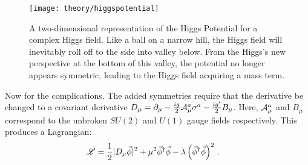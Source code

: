     \begin{figure}[h!]
        \texttt{[image: theory/higgspotential]}
        \caption{A two-dimensional representation of the Higgs Potential for a complex Higgs field\cite{higgspotential}.
            Like a ball on a narrow hill, the Higgs field will inevitably roll off to the side into valley below.
            From the Higgs's new perspective at the bottom of this valley,
                the potential no longer appears symmetric,
                leading to the Higgs field acquiring a mass term.
        }
        \label{fig:higgs_potential}
    \end{figure}

    Now for the complications.
    The added symmetries require that the derivative be changed to a covariant derivative 
        $D_{\mu} = \partial_{\mu} - \frac{ig}{2} \mathcal{A}^a_{\mu} \sigma^a - \frac{ig'}{2} B_{\mu}$.
    Here, $\mathcal{A}^a_\mu$ and $B_\mu$ correspond to the unbroken $SU(2)$ and $U(1)$ gauge fields respectively.
    This produces a Lagrangian:
    \begin{equation} \begin{split}
        \mathscr{L} &= \frac{1}{2} |D_{\mu} \vec{\phi}|^2 +
            \mu^2 \vec{\phi}^\dag \vec{\phi} - \lambda \left( \vec{\phi}^\dag\vec{\phi} \right)^2
        \,.
    \end{split} \end{equation}


